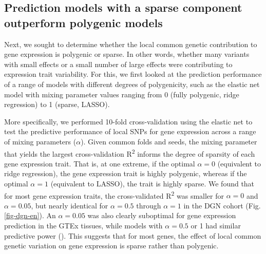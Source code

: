 \documentclass[10pt,letterpaper]{article}
\begin{document}
\subsection*{Prediction models with a sparse component outperform polygenic models}\label{the-effect-of-local-genetic-variation-on-gene-expression-is-sparse-rather-than-polygenic}

Next, we sought to determine whether the local common genetic contribution to gene expression is polygenic or sparse. In other words, whether many variants with small effects or a small number of large effects were contributing to expression trait variability. For this, we first looked at the prediction performance of a range of models with different degrees of polygenicity, such as the elastic net model with  mixing parameter values ranging from 0 (fully polygenic, ridge regression) to 1 (sparse, LASSO).

More specifically, we performed 10-fold cross-validation using the elastic net \cite{Zou_2005} to test the predictive performance of local SNPs for gene expression across a range of mixing parameters ($\alpha$). Given common folds and seeds, the mixing parameter that yields the largest cross-validation R\textsuperscript{2} informs the degree of sparsity of each gene expression trait. That is, at one extreme, if the optimal \(\alpha=0\) (equivalent to ridge regression), the gene expression trait is highly polygenic, whereas if the optimal \(\alpha=1\) (equivalent to LASSO), the trait is highly sparse. We found that for most gene expression traits, the cross-validated R\textsuperscript{2} was smaller for \(\alpha=0\) and \(\alpha=0.05\), but nearly identical for \(\alpha=0.5\) through \(\alpha=1\) in the DGN cohort (Fig. \ref{fig-dgn-en}). An \(\alpha=0.05\) was also clearly suboptimal for gene expression prediction in the GTEx tissues, while models with \(\alpha=0.5\) or 1 had similar predictive power (). This suggests that for most genes, the effect of local common genetic variation on gene expression is sparse rather than polygenic.
\end{document}
